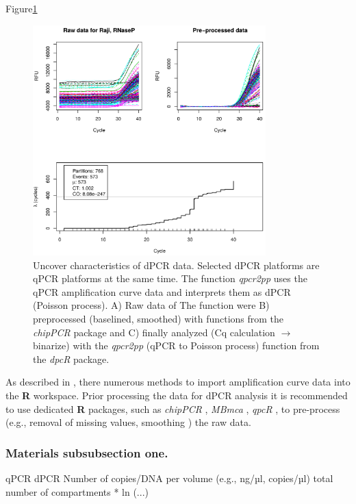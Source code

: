 \documentclass[a4,center,fleqn]{NAR}
\begin{document}
Figure\ref{qpcr2pp_1}

\begin{figure}[t]
\begin{center}
\includegraphics[width=9cm]{qpcr2pp_1.png}
\end{center}
\caption{Uncover characteristics of dPCR data. 
Selected dPCR platforms are qPCR platforms at the same time. The function \textit{qpcr2pp} uses the 
qPCR amplification curve data and interprets them as dPCR (Poisson process). A) Raw data of The 
function were B) preprocessed (baselined, smoothed) with functions from the 
\textit{chipPCR} package and C) finally analyzed (Cq calculation $\rightarrow$ binarize) with the 
\textit{qpcr2pp} (qPCR to Poisson process) function from the \textit{dpcR} package.} 
\label{qpcr2pp_1}
\end{figure}

As described in \cite{ritz_qpcr_2008, perkins_readqpcr_2012, 
pabinger_survey_2014, rodiger_r_2015}, there numerous methods to import 
amplification curve data into the \textbf{R} workspace. Prior processing the 
data for dPCR analysis it is recommended to use dedicated \textbf{R} packages, 
such as \textit{chipPCR} \cite{roediger2015chippcr}, \textit{MBmca} 
\cite{rodiger_surface_2013}, \textit{qpcR} \cite{ritz_qpcr_2008}, to 
pre-process (e.g., removal of missing values, smoothing 
\cite{spiess_impact_2015}) the raw data.

\subsubsection{Materials subsubsection one.}

qPCR	dPCR
Number of copies/DNA per volume (e.g., ng/µl, copies/µl)	total number of compartments * ln (...)
\end{document}

